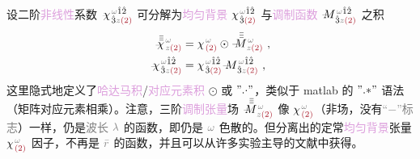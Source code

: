 设二阶\textcolor{Plum}{非线性}系数 $\Xint{{}^{}_{\mathcolor{gray}{-}}}{23}{\chi}^{\;\! \mathcolor{gray}{\omega} \hat{1} \hat{2} }_{\;\! \hat{3} \mathcolor{gray}{z} \textcolor{Maroon}{(2)} }$ 可分解为\textcolor{Plum}{均匀背景} ${\chi}^{\;\! \mathcolor{gray}{\omega} \hat{1} \hat{2} }_{\;\! \hat{3} \textcolor{Maroon}{(2)} }$ 与\textcolor{Plum}{调制函数} $\Xint{\mathcolor{gray}{-}}{18}{M}^{\;\! \mathcolor{gray}{\omega} \hat{1} \hat{2} }_{\;\! \hat{3} \mathcolor{gray}{z} \textcolor{Maroon}{(2)} }$ 之积
\begin{subequations} \label{eq:chi2-modulate}
\begin{align}
	\Xint{{}^{}_{\mathcolor{gray}{-}}}{23}{\bar{\bar{\bar{\chi}}}}^{\;\! \mathcolor{gray}{\omega} }_{\;\! \mathcolor{gray}{z} \textcolor{Maroon}{(2)} } &= {\chi}^{\;\! \mathcolor{gray}{\omega} }_{\;\! \textcolor{Maroon}{(2)} } \odot \Xint{\mathcolor{gray}{-}}{18}{\bar{\bar{\bar{M}}}}^{\;\! \mathcolor{gray}{\omega} }_{\;\! \mathcolor{gray}{z} \textcolor{Maroon}{(2)} } ~, \label{eq:vec-eq:chi2-modulate} \\
	\Xint{{}^{}_{\mathcolor{gray}{-}}}{23}{\chi}^{\;\! \mathcolor{gray}{\omega} \hat{1} \hat{2} }_{\;\! \hat{3} \mathcolor{gray}{z} \textcolor{Maroon}{(2)} } &= {\chi}^{\;\! \mathcolor{gray}{\omega} \hat{1} \hat{2} }_{\;\! \hat{3} \textcolor{Maroon}{(2)} } \Xint{\mathcolor{gray}{-}}{18}{M}^{\;\! \mathcolor{gray}{\omega} \hat{1} \hat{2} }_{\;\! \hat{3} \mathcolor{gray}{z} \textcolor{Maroon}{(2)} } ~, \label{eq:components-eq:chi2-modulate}
\end{align}
\end{subequations}
这里隐式地定义了\textcolor{Plum}{哈达马积}/\textcolor{Plum}{对应元素积} $\odot$ 或 $"{.\cdot}"$，类似于 matlab 的 $"{.*}"$ 语法（矩阵对应元素相乘）。注意，三阶\textcolor{Plum}{调制张量}\textcolor{NavyBlue}{场} $\Xint{\mathcolor{gray}{-}}{18}{\bar{\bar{\bar{M}}}}^{\;\! \mathcolor{gray}{\omega} }_{\;\! \mathcolor{gray}{z} \textcolor{Maroon}{(2)} }$ 像 ${\chi}^{\;\! \mathcolor{gray}{\omega} }_{\;\! \textcolor{Maroon}{(2)} }$（\textcolor{NavyBlue}{非场}，没有\textcolor{gray}{“$-$”标志}）一样，仍是\textcolor{gray}{波长} $\mathcolor{gray}{\lambda}$ 的函数，即仍是 $\mathcolor{gray}{\omega}$ \textcolor{NavyBlue}{色散}的。但分离出的定常\textcolor{Plum}{均匀背景}张量 ${\chi}^{\;\! \mathcolor{gray}{\omega} }_{\;\! \textcolor{Maroon}{(2)} }$ 因子，不再是 $\mathcolor{gray}{\bar{r}}$ 的函数，并且可以从许多\textcolor{NavyBlue}{实验主导}的文献中获得\cite{nyePhysicalPropertiesCrystals2012,zuOpticalSecondHarmonic2024,zuAnalyticalNumericalModeling2022,gananyQuasiphaseMatchingLiNbO32006,segondsLinearNonlinearOptical2004,dolevLinearNonlinearOptical2009,kaschkeCalculationNonlinearOptical1989,itoGeneralizedStudyAngular1975}。

